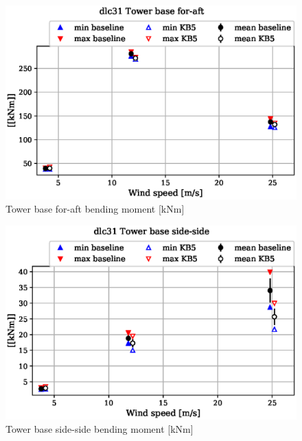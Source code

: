 \begin{figure}[!ht]
\begin{center}
	\includegraphics[width=.85\linewidth]{figures/baseline-vs-KB6/dlc31/tower-tower-node-001-momentvec-x_AA0007_AA0003.eps}
\end{center}
\caption{Tower base for-aft bending moment [kNm]}
\label{fig:baseline-vs-KB6:dlc31:tower-base-fa}
\end{figure}

\begin{figure}[!ht]
\begin{center}
	\includegraphics[width=.85\linewidth]{figures/baseline-vs-KB6/dlc31/tower-tower-node-001-momentvec-y_AA0007_AA0003.eps}
\end{center}
\caption{Tower base side-side bending moment [kNm]}
\label{fig:baseline-vs-KB6:dlc31:tower-base-ss}
\end{figure}

